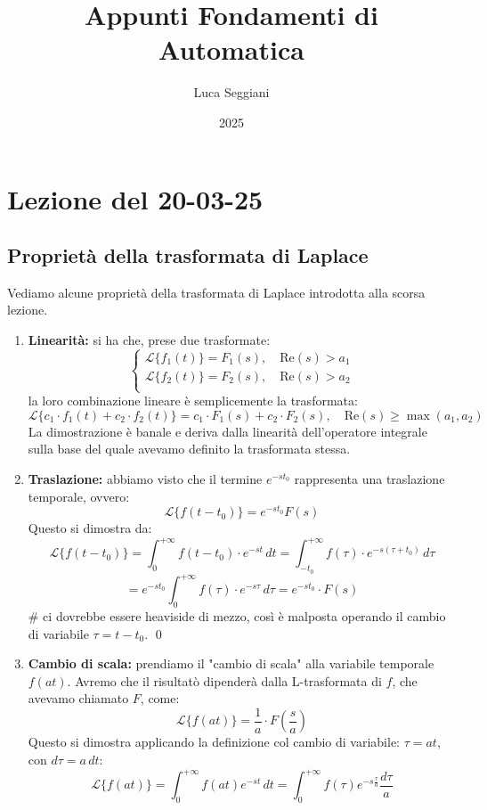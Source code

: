 \documentclass[a4paper,11pt]{article}
\title{Appunti Fondamenti di Automatica}
\author{Luca Seggiani}
\date{2025}
\begin{document}
\section{Lezione del 20-03-25}
		
\thispagestyle{empty}
\pagestyle{fancy}

\subsection{Proprietà della trasformata di Laplace}
Vediamo alcune proprietà della trasformata di Laplace introdotta alla scorsa lezione.

\begin{enumerate}
	\item \textbf{Linearità:} si ha che, prese due trasformate:
		\[
			\begin{cases}
				\mathcal{L}\{f_1(t)\} = F_1(s), \quad \mathrm{Re}(s) > a_1 \\ 	
				\mathcal{L}\{f_2(t)\} = F_2(s), \quad \mathrm{Re}(s) > a_2 \\ 	
			\end{cases}
		\]
		la loro combinazione lineare è semplicemente la trasformata:
		$$
		\mathcal{L}\{c_1 \cdot f_1(t) + c_2 \cdot f_2(t)\} = c_1 \cdot F_1(s) + c_2 \cdot F_2(s), \quad \mathrm{Re}(s) \geq \max(a_1, a_2)
		$$
		La dimostrazione è banale e deriva dalla linearità dell'operatore integrale sulla base del quale avevamo definito la trasformata stessa.
	\item \textbf{Traslazione:} abbiamo visto che il termine $e^{-s t_0}$ rappresenta una traslazione temporale, ovvero:
		$$
		\mathcal{L}\{ f(t - t_0) \} = e^{-s t_0} F(s)
		$$
		Questo si dimostra da:
		$$
		\mathcal{L}\{f(t - t_0)\} = \int_0^{+\infty} f(t - t_0) \cdot e^{-s t} \, dt = \int_{-t_0}^{+\infty} f(\tau) \cdot e^{-s(\tau + t_0)} \, d\tau 
		$$
		$$
		= e^{-s t_0} \int_0^{+ \infty} f(\tau) \cdot e^{-s \tau} \, d\tau = e^{-s t_0} \cdot F(s)
		$$ # ci dovrebbe essere heaviside di mezzo, così è malposta
		operando il cambio di variabile $\tau = t - t_0$. \qed
	\item \textbf{Cambio di scala:} prendiamo il "cambio di scala" alla variabile temporale $f(at)$. Avremo che il risultatò dipenderà dalla L-trasformata di $f$, che avevamo chiamato $F$, come:
		$$
			\mathcal{L}\{f(at)\} = \frac{1}{a} \cdot F\left(\frac{s}{a}\right) 
		$$
		Questo si dimostra applicando la definizione col cambio di variabile: $\tau = at$, con $d\tau = a \, dt$:
		$$
		\mathcal{L}\{f(at) \} = \int_0^{+ \infty} f(at) e^{-st} \, dt = \int_0^{+ \infty} f(\tau) e^{-s \frac{\tau}{a}} \frac{d\tau}{a}
$$
\end{enumerate}
\end{document}
